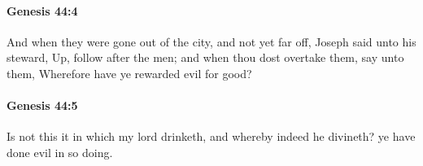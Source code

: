 		\paragraph{Genesis 44:4} %
			\label{GENESIS-44-4}

			And when they were gone out of the city, and not yet far off, Joseph said unto his steward, Up, follow after the men; and when thou dost overtake them, say unto them, Wherefore have ye rewarded evil for good?


		\paragraph{Genesis 44:5} %
			\label{GENESIS-44-5}

			Is not this it in which my lord drinketh, and whereby indeed he divineth? ye have done evil in so doing.



